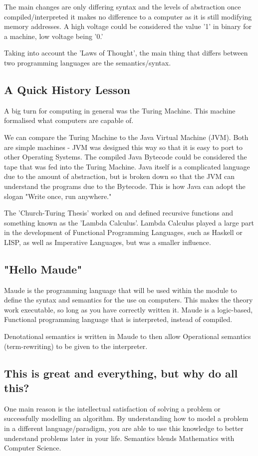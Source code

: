 \documentclass[12pt]{article}
\begin{document}
The main changes are only differing syntax and the levels of abstraction
once compiled/interpreted it makes no difference to a computer as it is
still modifying memory addresses.  A high voltage could be considered the value
'1' in binary for a machine, low voltage being '0.'

Taking into account the 'Laws of Thought'\cite{wikiLawThought}, the main thing
that differs between two programming languages are the semantics/syntax.

\subsection{A Quick History Lesson}
\label{sec-1-5}
A big turn for computing in general was the Turing Machine.  This machine
formalised what computers are capable of.

We can compare the Turing Machine to the Java Virtual Machine (JVM).  Both are
simple machines - JVM was designed this way so that it is easy to port to other
Operating Systems.  The compiled Java Bytecode could be considered the tape
that was fed into the Turing Machine.  Java itself is a complicated language
due to the amount of abstraction, but is broken down so that the JVM can
understand the programs due to the Bytecode.  This is how Java can adopt the
slogan "Write once, run anywhere."

The 'Church-Turing Thesis\cite{wikiChurchTuring}' worked on and
defined recursive functions and something known as the 'Lambda 
Calculus\cite{wikiLambdaCalc}'.  Lambda Calculus played a large part in the
development of Functional Programming Languages, such as
Haskell\cite{learnYouHaskell} or LISP, as well as Imperative Languages, but was
a smaller influence.

\subsection{"Hello Maude"}
\label{sec-1-6}
Maude is the programming language that will be used within the module to define
the syntax and semantics for the use on computers.  This makes the theory work
executable, so long as you have correctly written it.  Maude is a logic-based,
Functional programming language that is interpreted, instead of compiled.

Denotational semantics is written in Maude to then allow Operational semantics
(term-rewriting) to be given to the interpreter.

\subsection{This is great and everything, but why do all this?}
\label{sec-1-7}
One main reason is the intellectual satisfaction of solving a problem or
successfully modelling an algorithm.  By understanding how to model a problem
in a different language/paradigm, you are able to use this knowledge to better
understand problems later in your life.  Semantics blends Mathematics with
Computer Science.
\end{document}
